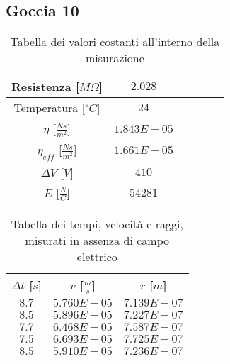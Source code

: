 \documentclass{article}
\begin{document}
\subsection{Goccia 10}
\begin{multicols}{2}

\begin{table}[H]
	\centering
	\begin{tabular}{| c | c | c | c | c | c |}
		\hline
		Resistenza [$M\Omega$] & $2.028$\\
		\hline
		Temperatura [$^\circ C$]& $24$\\
		\hline
		$\eta$ [$\frac{Ns}{m^2}$] & $1.843E-05$\\
		\hline
		$\eta_{eff}$ [$\frac{Ns}{m^2}$] & $1.661E-05$\\
		\hline
		$\Delta V$ [$V$] & $410$\\
		\hline
		$E$ [$\frac N C$] & $54281$\\
		\hline
	\end{tabular}
	\caption{Tabella dei valori costanti all'interno della misurazione}
	\label{}
\end{table}

\columnbreak

\begin{table}[H]
	\centering
	\begin{tabular}{| c | c | c |}
		\hline
		$\Delta t$ [$s$] & $v$ [$\frac ms$] & $r$ [$m$] \\
		\hline
		$8.7$ & $5.760E-05$ & $7.139E-07$ \\
		$8.5$ & $5.896E-05$ & $7.227E-07$ \\
		$7.7$ & $6.468E-05$ & $7.587E-07$ \\
		$7.5$ & $6.693E-05$ & $7.725E-07$ \\
		$8.5$ & $5.910E-05$ & $7.236E-07$ \\
		\hline
	\end{tabular}
	\caption{Tabella dei tempi, velocità e raggi, misurati in assenza di campo elettrico}
	\label{}
\end{table}
	
\end{multicols}
\end{document}
